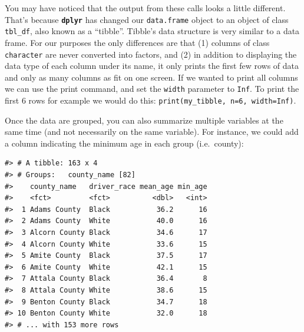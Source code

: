 \documentclass[]{book}
\newenvironment{Shaded}{\begin{snugshade}}{\end{snugshade}}
\newcommand{\DataTypeTok}[1]{\textcolor[rgb]{0.13,0.29,0.53}{#1}}
\newcommand{\KeywordTok}[1]{\textcolor[rgb]{0.13,0.29,0.53}{\textbf{#1}}}
\newcommand{\NormalTok}[1]{#1}
\newcommand{\OperatorTok}[1]{\textcolor[rgb]{0.81,0.36,0.00}{\textbf{#1}}}
\newcommand{\OtherTok}[1]{\textcolor[rgb]{0.56,0.35,0.01}{#1}}
\newcommand{\StringTok}[1]{\textcolor[rgb]{0.31,0.60,0.02}{#1}}
\begin{document}
You may have noticed that the output from these calls looks a little different. That's because \textbf{\texttt{dplyr}} has changed our \texttt{data.frame} object
to an object of class \texttt{tbl\_df}, also known as a ``tibble''. Tibble's data
structure is very similar to a data frame. For our purposes the only differences
are that (1) columns of class \texttt{character} are never converted into
factors, and (2) in addition to displaying the data type of each column under its name, it only prints the first few rows of data and only as many columns as fit on one screen. If we wanted to print all columns we can use the print command, and set the \texttt{width} parameter to \texttt{Inf}. To print the first 6 rows for example we would do this: \texttt{print(my\_tibble,\ n=6,\ width=Inf)}.

Once the data are grouped, you can also summarize multiple variables at the same
time (and not necessarily on the same variable). For instance, we could add a
column indicating the minimum age in each group (i.e.~county):

\begin{Shaded}
\end{Shaded}

\begin{verbatim}
#> # A tibble: 163 x 4
#> # Groups:   county_name [82]
#>    county_name   driver_race mean_age min_age
#>    <fct>         <fct>          <dbl>   <int>
#>  1 Adams County  Black           36.2      16
#>  2 Adams County  White           40.0      16
#>  3 Alcorn County Black           34.6      17
#>  4 Alcorn County White           33.6      15
#>  5 Amite County  Black           37.5      17
#>  6 Amite County  White           42.1      15
#>  7 Attala County Black           36.4       8
#>  8 Attala County White           38.6      15
#>  9 Benton County Black           34.7      18
#> 10 Benton County White           32.0      18
#> # ... with 153 more rows
\end{verbatim}
\end{document}
